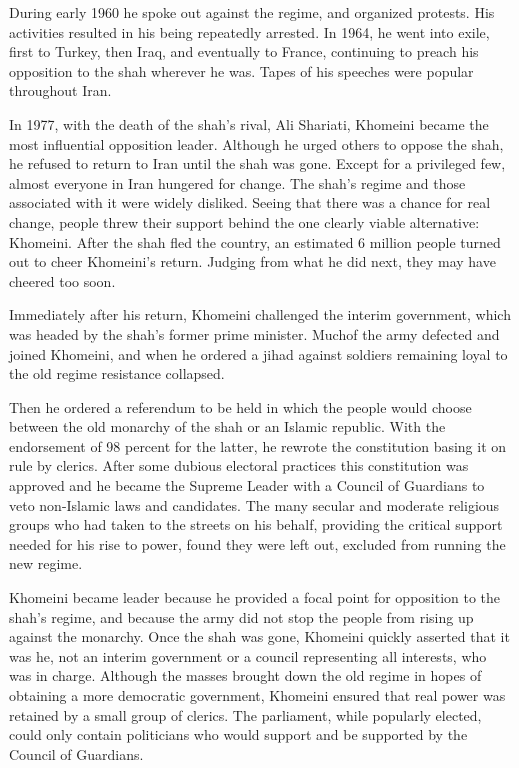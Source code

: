 \documentclass[10pt]{article}
\begin{document}
{\large During early 1960 he spoke out against the regime, and organized
protests. His activities resulted in his being repeatedly arrested. In 1964, he
went into exile, first to Turkey, then Iraq, and eventually to France, continuing
to preach his opposition to the shah wherever he was. Tapes of his speeches were
popular throughout Iran.}

{\large In 1977, with the death of the shah's rival, Ali Shariati, Khomeini
became the most influential opposition leader. Although he urged others to oppose
the shah, he refused to return to Iran until the shah was gone. Except for a
privileged few, almost everyone in Iran hungered for change. The shah's regime
and those associated with it were widely disliked. Seeing that there was a chance
for real change, people threw their support behind the one clearly viable
alternative: Khomeini. After the shah fled the country, an estimated 6 million
people turned out to cheer Khomeini's return. Judging from what he did next, they
may have cheered too soon.}

{\large Immediately after his return, Khomeini challenged the interim
government, which was headed by the shah's former prime minister. Muchof the army
defected and joined Khomeini, and when he ordered a jihad against soldiers
remaining loyal to the old regime resistance collapsed.}

{\large Then he ordered a referendum to be held in which the people would choose
between the old monarchy of the shah or an Islamic republic. With the endorsement
of 98 percent for the latter, he rewrote the constitution basing it on rule by
clerics. After some dubious electoral practices this constitution was approved
and he became the Supreme Leader with a Council of Guardians to veto non-Islamic
laws and candidates. The many secular and moderate religious groups who had taken
to the streets on his behalf, providing the critical support needed for his rise
to power, found they were left out, excluded from running the new regime.}

{\large Khomeini became leader because he provided a focal point for opposition
to the shah's regime, and because the army did not stop the people from rising up
against the monarchy. Once the shah was gone, Khomeini quickly asserted that it
was he, not an interim government or a council representing all interests, who
was in charge. Although the masses brought down the old regime in hopes of
obtaining a more democratic government, Khomeini ensured that real power was
retained by a small group of clerics. The parliament, while popularly elected,
could only contain politicians who would support and be supported by the Council
of Guardians.}
\end{document}
